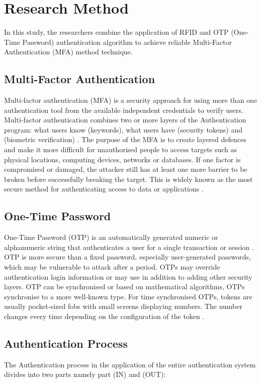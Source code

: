 \section{Research Method}
\label{ResearchMethod}
In this study, the researchers combine the application of RFID and OTP (One-Time Password) authentication algorithm to achieve reliable Multi-Factor Authentication (MFA) method technique.

\subsection{Multi-Factor Authentication}
Multi-factor authentication (MFA) is a security approach for using more than one authentication tool from the available independent credentials to verify users. Multi-factor authentication combines two or more layers of the Authentication program: what users know (keywords), what users have (security tokens) and (biometric verification) \cite{oke2017developing}. The purpose of the MFA is to create layered defences and make it more difficult for unauthorised people to access targets such as physical locations, computing devices, networks or databases. If one factor is compromised or damaged, the attacker still has at least one more barrier to be broken before successfully breaking the target. This is widely known as the most secure method for authenticating access to data or applications \cite{shah2015multi}.
\subsection{One-Time Password}
One-Time Password (OTP) is an automatically generated numeric or alphanumeric string that authenticates a user for a single transaction or session \cite{huang2013rfid}. OTP is more secure than a fixed password, especially user-generated passwords, which may be vulnerable to attack after a period. OTPs may override authentication login information or may use in addition to adding other security layers. OTP can be synchronised or based on mathematical algorithms, OTPs synchronise to a more well-known type. For time synchronised OTPs, tokens are usually pocket-sized fobs with small screens displaying numbers. The number changes every time depending on the configuration of the token \cite{jacob2015mobile}.
\subsection{Authentication Process}
The Authentication process in the application of the entire authentication system divides into two parts namely part (IN) and (OUT):

